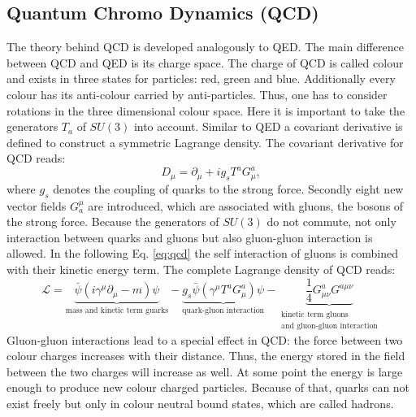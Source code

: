 	\subsection{Quantum Chromo Dynamics (QCD)}
	The theory behind QCD is developed analogously to QED. The main difference between QCD and QED is its charge space. The charge of QCD is called colour and exists in three states for particles: red, green and blue. Additionally every colour has its anti-colour carried by anti-particles. Thus, one has to consider rotations in the three dimensional colour space. Here it is important to take the generators $T_a$ of $SU(3)$ into account. Similar to QED a covariant derivative is defined to construct a symmetric Lagrange density. The covariant derivative for QCD reads:
	\begin{equation}
	D_\mu = \partial_\mu + i g_s T^a G^a_{\mu},
	\end{equation}
	where $g_s$ denotes the coupling of quarks to the strong force. Secondly eight new vector fields $G_a^\mu$ are introduced, which are associated with gluons, the bosons of the strong force. Because the generators of $SU(3)$ do not commute, not only interaction between quarks and gluons but also gluon-gluon interaction is allowed. In the following Eq. \ref{eq:qcd} the self interaction of gluons is combined with their kinetic energy term. The complete Lagrange density of QCD reads:
	\begin{equation}
	\mathcal{L} = \underbrace{\bar{\psi}(i \gamma^\mu \partial_\mu -m ) \psi}_{\text{mass and kinetic term guarks}} - \underbrace{g_s \bar{\psi}(\gamma^\mu T^a G^a_\mu) \psi}_{\text{quark-gluon interaction}} - \underbrace{\frac{1}{4} G^a_{\mu \nu}G^{a \mu \nu}}_{\substack{\text{kinetic term gluons} \\ \text{and gluon-gluon interaction}}}
	\label{eq:qcd}
	\end{equation}
	Gluon-gluon interactions lead to a special effect in QCD: the force between two colour charges increases with their distance. Thus, the energy stored in the field between the two charges will increase as well. At some point the energy is large enough to produce new colour charged particles. Because of that, quarks can not exist freely but only in colour neutral bound states, which are called hadrons.
